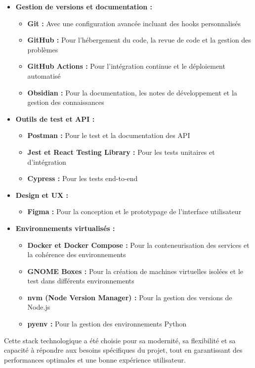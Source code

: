 \begin{itemize}
  \item \textbf{Gestion de versions et documentation :}
  \begin{itemize}
    \item \textbf{Git :} Avec une configuration avancée incluant des hooks personnalisés
    \item \textbf{GitHub :} Pour l'hébergement du code, la revue de code et la gestion des problèmes
    \item \textbf{GitHub Actions :} Pour l'intégration continue et le déploiement automatisé
    \item \textbf{Obsidian :} Pour la documentation, les notes de développement et la gestion des connaissances
  \end{itemize}
  
  \item \textbf{Outils de test et API :}
  \begin{itemize}
    \item \textbf{Postman :} Pour le test et la documentation des API
    \item \textbf{Jest et React Testing Library :} Pour les tests unitaires et d'intégration
    \item \textbf{Cypress :} Pour les tests end-to-end
  \end{itemize}
  
  \item \textbf{Design et UX :}
  \begin{itemize}
    \item \textbf{Figma :} Pour la conception et le prototypage de l'interface utilisateur
  \end{itemize}
  
  \item \textbf{Environnements virtualisés :}
  \begin{itemize}
    \item \textbf{Docker et Docker Compose :} Pour la conteneurisation des services et la cohérence des environnements
    \item \textbf{GNOME Boxes :} Pour la création de machines virtuelles isolées et le test dans différents environnements
    \item \textbf{nvm (Node Version Manager) :} Pour la gestion des versions de Node.js
    \item \textbf{pyenv :} Pour la gestion des environnements Python
  \end{itemize}
\end{itemize}

Cette stack technologique a été choisie pour sa modernité, sa flexibilité et sa capacité à répondre aux besoins spécifiques du projet, tout en garantissant des performances optimales et une bonne expérience utilisateur. 

